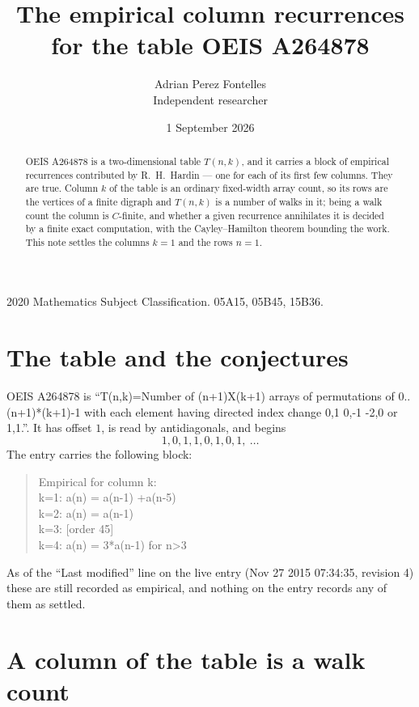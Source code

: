 \documentclass[11pt,a4paper]{article}
\title{The empirical column recurrences for the table OEIS A264878}
\author{Adrian Perez Fontelles\\ \small Independent researcher}
\date{1 September 2026}
\theoremstyle{plain}
\theoremstyle{definition}
\begin{document}
\maketitle

\begin{abstract}
OEIS A264878 is a two-dimensional table $T(n,k)$, and it carries a block of empirical
recurrences contributed by R.~H.~Hardin --- one for each of its first few columns. They are
true. Column $k$ of the table is an ordinary fixed-width array count, so its rows are the
vertices of a finite digraph and $T(n,k)$ is a number of walks in it; being a walk count the
column is $C$-finite, and whether a given recurrence annihilates it is decided by a finite
exact computation, with the Cayley--Hamilton theorem bounding the work. This note settles the columns $k=1$ and the rows $n=1$.
\end{abstract}

\noindent\small 2020 Mathematics Subject Classification. 05A15, 05B45, 15B36.\normalsize

\section{The table and the conjectures}

OEIS A264878 is ``T(n,k)=Number of (n+1)X(k+1) arrays of permutations of 0..(n+1)*(k+1)-1 with each element having directed index change 0,1 0,-1 -2,0 or 1,1.''. It has offset $1$, is
read by antidiagonals, and begins
\[
1, 0, 1, 1, 0, 1, 0, 1,\ \dots
\]
The entry carries the following block:
\begin{quote}\small
Empirical for column k:\\
k=1: a(n) = a(n-1) +a(n-5)\\
k=2: a(n) = a(n-1)\\
k=3: [order 45]\\
k=4: a(n) = 3*a(n-1) for n>3\\
\end{quote}
As of the ``Last modified'' line on the live entry (Nov 27 2015 07:34:35, revision 4) these are still
recorded as empirical, and nothing on the entry records any of them as settled.

\section{A column of the table is a walk count}
\end{document}
